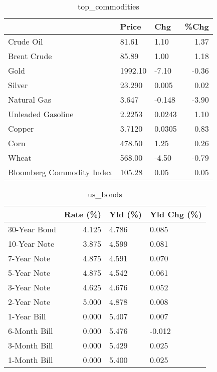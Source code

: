 \documentclass{article}%
\begin{document}
\begin{table}[htbp]%
\caption{top\_commodities}%
\centering%
\begin{adjustbox}{width=1\textwidth}%
\begin{tabular}{lllr}
\toprule
                          &   Price &    Chg &  \%Chg \\
\midrule
               Crude Oil  &   81.61 &   1.10 &  1.37 \\
             Brent Crude  &   85.89 &   1.00 &  1.18 \\
                    Gold  & 1992.10 &  -7.10 & -0.36 \\
                  Silver  &  23.290 &  0.005 &  0.02 \\
             Natural Gas  &   3.647 & -0.148 & -3.90 \\
       Unleaded Gasoline  &  2.2253 & 0.0243 &  1.10 \\
                  Copper  &  3.7120 & 0.0305 &  0.83 \\
                    Corn  &  478.50 &   1.25 &  0.26 \\
                   Wheat  &  568.00 &  -4.50 & -0.79 \\
Bloomberg Commodity Index &  105.28 &   0.05 &  0.05 \\
\bottomrule
\end{tabular}
%
\end{adjustbox}%
\end{table}

%


\begin{table}[htbp]%
\caption{us\_bonds}%
\centering%
\begin{adjustbox}{width=1\textwidth}%
\begin{tabular}{lrll}
\toprule
             &  Rate (\%) & Yld (\%) & Yld Chg (\%) \\
\midrule
30-Year Bond &     4.125 &   4.786 &       0.085 \\
10-Year Note &     3.875 &   4.599 &       0.081 \\
 7-Year Note &     4.875 &   4.591 &       0.070 \\
 5-Year Note &     4.875 &   4.542 &       0.061 \\
 3-Year Note &     4.625 &   4.676 &       0.052 \\
 2-Year Note &     5.000 &   4.878 &       0.008 \\
 1-Year Bill &     0.000 &   5.407 &       0.007 \\
6-Month Bill &     0.000 &   5.476 &      -0.012 \\
3-Month Bill &     0.000 &   5.429 &       0.025 \\
1-Month Bill &     0.000 &   5.400 &       0.025 \\
\bottomrule
\end{tabular}
%
\end{adjustbox}%
\end{table}
\end{document}
